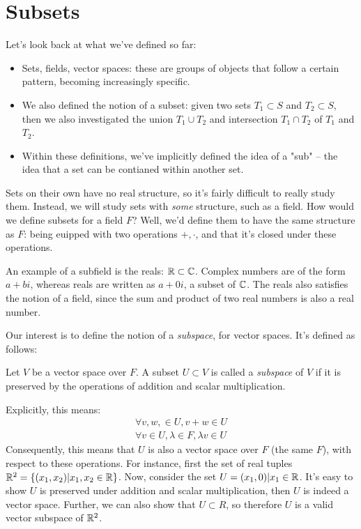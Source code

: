 \section{Subsets}
Let's look back at what we've defined so far: 
	\begin{itemize}
		\item Sets, fields, vector spaces: these are groups of objects that follow a certain pattern, 
			becoming increasingly specific.
		\item We also defined the notion of a subset: given two sets \( T_1 \subset S \) and \( T_2 \subset S \), 
			then we also investigated the union \( T_1 \cup T_2 \) and intersection \( T_1 \cap T_2 \) 
			of \( T_1 \) and \( T_2 \). 
		\item Within these definitions, we've implicitly defined the idea of a "sub" -- the idea that 
			a set can be contianed within another set.
	\end{itemize}
Sets on their own have no real structure, so it's fairly difficult to really study them. Instead, 
we will study sets with \textit{some} structure, such as a field. How would we define subsets for a
field \( F \)? Well, we'd define them to have the same structure as \( F \): being euipped with two 
operations \( +, \cdot \), and that it's closed under these operations. 

An example of a subfield is the reals: \( \mathbb R \subset \mathbb C \). Complex numbers are of the 
form \( a + bi \), whereas reals are written as \( a + 0i \), a subset of \( \mathbb C \). The reals 
also satisfies the notion of a field, since the sum and product of two real numbers is also a 
real number. 

Our interest is to define the notion of a \textit{subspace}, for vector spaces. It's defined as follows:
\begin{definition}
	Let \( V \) be a vector space over \( F \). A subset \( U \subset V \) is called a \textit{subspace} of 
	\( V \) if it is preserved by the operations of addition and scalar multiplication.
\end{definition}
Explicitly, this means:
\begin{align*}
	\forall v, w, \in U, v + w \in U\\
	\forall v \in U, \lambda \in F, \lambda v \in U
\end{align*}
Consequently, this means that \( U \) is also a vector space over \( F \) (the same \( F \)), with respect 
to these operations. For instance, first the set of real tuples 
\( \mathbb R^2 = \{(x_1, x_2) \vert x_1, x_2 \in \mathbb R \}  \). Now, consider the set \( U = (x_1, 0) \vert x_1 \in \mathbb R\). 
It's easy to show \( U \) is preserved under addition and scalar multiplication, then \( U \) is indeed a vector space.
Further, we can also show that \( U \subset  R \), so therefore \( U  \) is a valid vector subspace of \( \mathbb R^2 \). 

